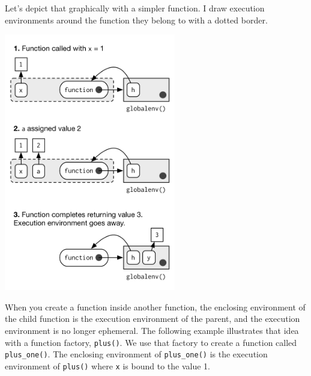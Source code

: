Let's depict that graphically with a simpler function. I draw execution
environments around the function they belong to with a dotted border.

\begin{Shaded}
\begin{Highlighting}[]
\StringTok{ }
  \StringTok{ }
  \StringTok{ }
\NormalTok{\}}
\StringTok{ }\NormalTok{(}\NormalTok{)}
\end{Highlighting}
\end{Shaded}

\includegraphics[width=2.95in]{diagrams/environments.png/execution.png}

When you create a function inside another function, the enclosing
environment of the child function is the execution environment of the
parent, and the execution environment is no longer ephemeral. The
following example illustrates that idea with a function factory,
\texttt{plus()}. We use that factory to create a function called
\texttt{plus\_one()}. The enclosing environment of \texttt{plus\_one()}
is the execution environment of \texttt{plus()} where \texttt{x} is
bound to the value 1. 

\begin{Shaded}
\begin{Highlighting}[]
\StringTok{ }
  \StringTok{ }
\NormalTok{\}}
\StringTok{ }\NormalTok{(}\NormalTok{)}
\NormalTok{(}\NormalTok{(}
\end{Highlighting}
\end{Shaded}

